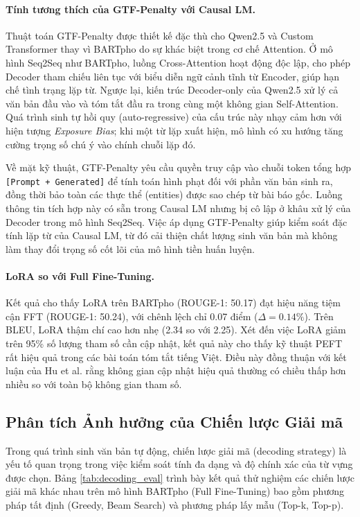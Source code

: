 \documentclass{article}
\begin{document}
\paragraph{Tính tương thích của GTF-Penalty với Causal LM.}
Thuật toán GTF-Penalty được thiết kế đặc thù cho Qwen2.5 và Custom Transformer thay vì BARTpho do sự khác biệt trong cơ chế Attention. Ở mô hình Seq2Seq như BARTpho, luồng Cross-Attention hoạt động độc lập, cho phép Decoder tham chiếu liên tục với biểu diễn ngữ cảnh tĩnh từ Encoder, giúp hạn chế tình trạng lặp từ. Ngược lại, kiến trúc Decoder-only của Qwen2.5 xử lý cả văn bản đầu vào và tóm tắt đầu ra trong cùng một không gian Self-Attention. Quá trình sinh tự hồi quy (auto-regressive) của cấu trúc này nhạy cảm hơn với hiện tượng \textit{Exposure Bias}; khi một từ lặp xuất hiện, mô hình có xu hướng tăng cường trọng số chú ý vào chính chuỗi lặp đó. 

Về mặt kỹ thuật, GTF-Penalty yêu cầu quyền truy cập vào chuỗi token tổng hợp \texttt{[Prompt + Generated]} để tính toán hình phạt đối với phần văn bản sinh ra, đồng thời bảo toàn các thực thể (entities) được sao chép từ bài báo gốc. Luồng thông tin tích hợp này có sẵn trong Causal LM nhưng bị cô lập ở khâu xử lý của Decoder trong mô hình Seq2Seq. Việc áp dụng GTF-Penalty giúp kiểm soát đặc tính lặp từ của Causal LM, từ đó cải thiện chất lượng sinh văn bản mà không làm thay đổi trọng số cốt lõi của mô hình tiền huấn luyện.

\paragraph{LoRA so với Full Fine-Tuning.}
Kết quả cho thấy LoRA trên BARTpho (ROUGE-1: 50.17) đạt hiệu năng tiệm cận FFT (ROUGE-1: 50.24), với chênh lệch chỉ 0.07 điểm ($\Delta = 0.14\%$). Trên BLEU, LoRA thậm chí cao hơn nhẹ (2.34 so với 2.25). Xét đến việc LoRA giảm trên 95\% số lượng tham số cần cập nhật, kết quả này cho thấy kỹ thuật PEFT rất hiệu quả trong các bài toán tóm tắt tiếng Việt. Điều này đồng thuận với kết luận của Hu et al. \cite{lora} rằng không gian cập nhật hiệu quả thường có chiều thấp hơn nhiều so với toàn bộ không gian tham số.

\subsection{Phân tích Ảnh hưởng của Chiến lược Giải mã}

Trong quá trình sinh văn bản tự động, chiến lược giải mã (decoding strategy) là yếu tố quan trọng trong việc kiểm soát tính đa dạng và độ chính xác của từ vựng được chọn. Bảng \ref{tab:decoding_eval} trình bày kết quả thử nghiệm các chiến lược giải mã khác nhau trên mô hình BARTpho (Full Fine-Tuning) bao gồm phương pháp tất định (Greedy, Beam Search) và phương pháp lấy mẫu (Top-k, Top-p).
\end{document}
